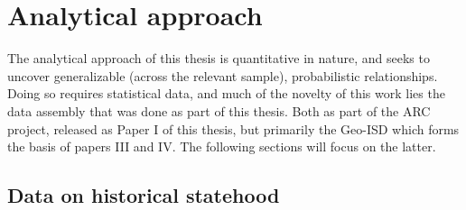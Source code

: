 \section{Analytical approach} \label{Analytical approach}


The analytical approach of this thesis is quantitative in nature, and seeks to
uncover generalizable (across the relevant sample), probabilistic relationships.
Doing so requires statistical data, and much of the novelty of this work lies
the data assembly that was done as part of this thesis. Both as part of the ARC
project, released as Paper I of this thesis, but primarily the Geo-ISD which
forms the basis of papers III and IV. The following sections will focus on the
latter.

\subsection{Data on historical statehood} \label{Data on historical statehood}






